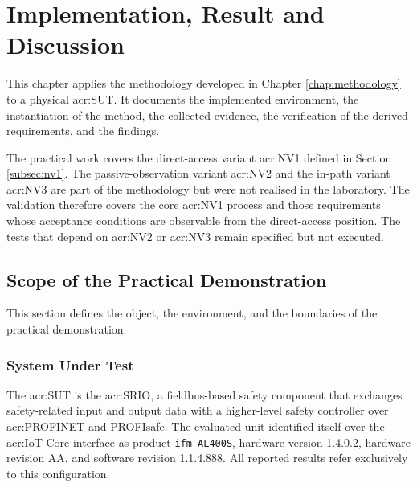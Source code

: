 \chapter{Implementation, Result and Discussion} 
\label{chap:implementation_results} 

This chapter applies the methodology developed in  Chapter \ref{chap:methodology} to a physical \gls{acr:SUT}. It documents the implemented environment, the instantiation of the method, the collected evidence, the verification of the derived requirements, and the findings.

The practical work covers the direct-access variant \gls{acr:NV1} defined in Section \ref{subsec:nv1}. The passive-observation variant \gls{acr:NV2} and the in-path variant \gls{acr:NV3} are part of the methodology but were not realised in the laboratory. The validation therefore covers the core \gls{acr:NV1} process and those requirements whose acceptance conditions are observable from the direct-access position. The tests that depend on \gls{acr:NV2} or \gls{acr:NV3} remain specified but not executed.



\section{Scope of the Practical Demonstration}
\label{sec:testbed_setup} 

This section defines the object, the environment, and the boundaries of the practical demonstration.

\subsection{System Under Test} 
\label{subsec:test_object} 

The \gls{acr:SUT} is the \gls{acr:SRIO}, a fieldbus-based safety component that exchanges safety-related input and output data with a higher-level safety controller over \gls{acr:PROFINET} and PROFIsafe. The evaluated unit identified itself over the \gls{acr:IoT}-Core interface as product \texttt{ifm-AL400S}, hardware version 1.4.0.2, hardware revision AA, and software revision 1.1.4.888. All reported results refer exclusively to this configuration.

